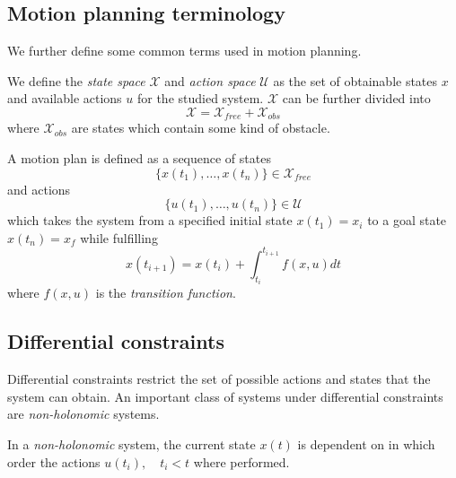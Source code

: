 \subsection{Motion planning terminology}
We further define some common terms used in motion planning.

\begin{definition}
    We define the \textit{state space} $\mathcal{X}$ and \textit{action space}
    $\mathcal{U}$ as the set of obtainable states $x$ and available actions $u$ for the
    studied system.
    $\mathcal{X}$ can be further divided into
    \begin{equation}
        \mathcal{X} = \mathcal{X}_{free} + \mathcal{X}_{obs}
    \end{equation}
    where $\mathcal{X}_{obs}$ are states which contain some kind of obstacle. 
\end{definition}

\begin{definition}
    A motion plan is defined as a sequence of states
    \begin{equation}
        \{x(t_1),\hdots, x(t_n)\}\in\mathcal{X}_{free}
    \end{equation}
    and actions
    \begin{equation}
        \{u(t_1),\hdots,u(t_n)\}\in\mathcal{U}
    \end{equation}
    which takes the system from a specified initial state $x(t_1)=x_i$ to a 
    goal state $x(t_n)=x_f$ while fulfilling
    \begin{equation}
        x(t_{i+1})=x(t_i) + \int_{t_i}^{t_{i+1}} f(x, u) dt
    \end{equation}
    where $f(x, u)$ is the \textit{transition function}.
\end{definition}

\subsection{Differential constraints}
Differential constraints restrict the set of possible actions and states that 
the system can obtain. An important class of systems under differential constraints 
are \textit{non-holonomic} systems.

\begin{definition}
    In a \textit{non-holonomic} system, the current state $x(t)$ is dependent 
    on in which order the actions $u(t_i),\quad t_i<t$ where performed.
\end{definition}

